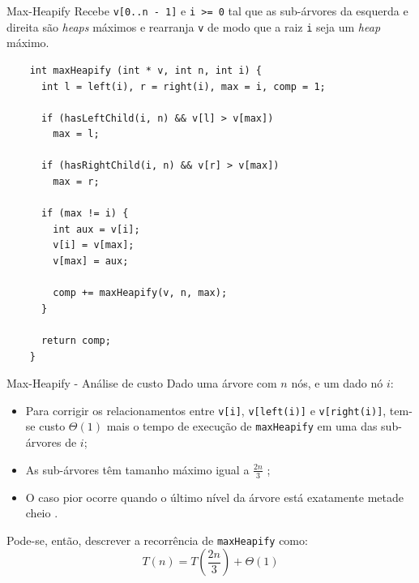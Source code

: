 \documentclass[t, 10pt]{beamer}
\begin{document}
  \begin{frame}[fragile]{Max-Heapify}
    Recebe \texttt{v[0..n - 1]} e \texttt{i >= 0} tal que as sub-árvores da esquerda e direita
    são \emph{heaps} máximos e rearranja \texttt{v} de modo que a raiz \texttt{i} seja um
    \emph{heap} máximo.
    
    \vspace{-1em}
    \begin{center}
    \begin{minipage}{0.72\textwidth}
    \begin{verbatim}
    int maxHeapify (int * v, int n, int i) {
      int l = left(i), r = right(i), max = i, comp = 1;
      
      if (hasLeftChild(i, n) && v[l] > v[max])
        max = l;
      
      if (hasRightChild(i, n) && v[r] > v[max])
        max = r;
        
      if (max != i) {
        int aux = v[i];
        v[i] = v[max];
        v[max] = aux;
        
        comp += maxHeapify(v, n, max);
      }
      
      return comp;
    }
    \end{verbatim}
    \end{minipage}
    \end{center}
  \end{frame}

  \begin{frame}{Max-Heapify - Análise de custo}
    Dado uma árvore com $n$ nós, e um dado nó $i$:
    
    \begin{itemize}
      \item Para corrigir os relacionamentos entre \texttt{v[i]}, \texttt{v[left(i)]} e \texttt{v[right(i)]},
      tem-se custo $\Theta(1)$ mais o tempo de execução de \texttt{maxHeapify} em uma das sub-árvores de $i$;
      \item As sub-árvores têm tamanho máximo igual a $\frac{2n}{3}$ \footnotemark[1];
      \item O caso pior ocorre quando o último nível da árvore está exatamente metade cheio \footnotemark[2].
    \end{itemize}

    Pode-se, então, descrever a recorrência de \texttt{maxHeapify} como: $$T(n) = T\left(\frac{2n}{3}\right) + \Theta(1)$$
  
  \end{frame}
\end{document}

